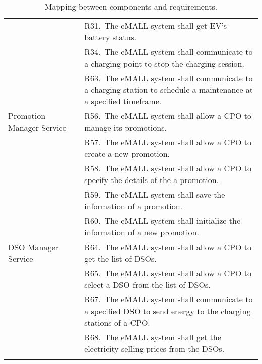 \begin{center}
\begin{longtable}{p{0.3\linewidth}p{0.7\linewidth}}
        & R31.\ The eMALL system shall get EV’s battery status.                                                                                           \\
        & R34.\ The eMALL system shall communicate to a charging point to stop the charging session.                                                      \\
        & R63.\ The eMALL system shall communicate to a charging station to schedule a maintenance at a specified timeframe.                              \\
        \hline
        Promotion Manager Service              & R56.\ The eMALL system shall allow a CPO to manage its promotions.                                                                              \\
        & R57.\ The eMALL system shall allow a CPO to create a new promotion.                                                                             \\
        & R58.\ The eMALL system shall allow a CPO to specify the details of the a promotion.                                                             \\
        & R59.\ The eMALL system shall save the information of a promotion.                                                                               \\
        & R60.\ The eMALL system shall initialize the information of a new promotion.                                                                     \\
        \hline
        DSO Manager Service                    & R64.\ The eMALL system shall allow a CPO to get the list of DSOs.                                                                               \\
        & R65.\ The eMALL system shall allow a CPO to select a DSO from the list of DSOs.                                                                 \\
        & R67.\ The eMALL system shall communicate to a specified DSO to send energy to the charging stations of a CPO.                                   \\
        & R68.\ The eMALL system shall get the electricity selling prices from the DSOs.                                                                  \\
        \hline
        \caption{Mapping between components and requirements.}
        \label{tab: map_comp_req}%
    \end{longtable}
\end{center}


